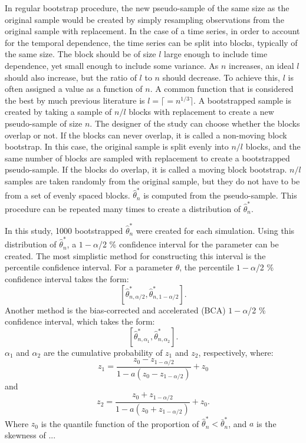 \documentclass[12pt, letterpaper, titlepage]{article}
\begin{document}
In regular bootstrap procedure, the new pseudo-sample of the same size as the original sample would be created by simply resampling observations from the original sample with replacement. In the case of a time series, in order to account for the temporal dependence, the time series can be split into blocks, typically of the same size. The block should be of size $l$ large enough to include time dependence, yet small enough to include some variance. As $n$ increases, an ideal $l$ should also increase, but the ratio of $l$ to $n$ should decrease. To achieve this, $l$ is often assigned a value as a function of $n$. A common function that is considered the best by much previous literature is $l = \lceil = n^{1/3} \rceil$. \citep{buhlmann1999block} A bootstrapped sample is created by taking a sample of $n / l$ blocks with replacement to create a new pseudo-sample of size $n$. The designer of the study can choose whether the blocks overlap or not. If the blocks can never overlap, it is called a non-moving block bootstrap. In this case, the original sample is split evenly into $n / l$ blocks, and the same number of blocks are sampled with replacement to create a bootstrapped pseudo-sample. If the blocks do overlap, it is called a moving block bootstrap. $n / l$ samples are taken randomly from the original sample, but they do not have to be from a set of evenly spaced blocks. $\hat\theta_n^*$ is computed from the pseudo-sample. This procedure can be repeated many times to create a distribution of $\hat\theta_n^*$. 

In this study, 1000 bootstrapped $\hat\theta_n^*$ were created for each simulation. Using this distribution of $\hat\theta_n^*$, a $1 - \alpha$/2 \% confidence interval for the parameter can be created. The most simplistic method for constructing this interval is the percentile confidence interval. For a parameter $\theta$, the percentile $1 - \alpha$/2 \% confidence interval takes the form: 
\[ [\hat\theta_{n, \alpha/2}^*, \hat\theta_{n, 1 - \alpha/2}^*].\] 
Another method is the bias-corrected and accelerated 
(BCA) $1 - \alpha$/2 \% confidence interval, which takes the form: 
\[ [\hat\theta_{n, \alpha_1}^*,\hat\theta_{n, \alpha_2}^*].\] 
$\alpha_{1}$ and $\alpha_{2}$ are the cumulative probability of $z_{1}$ and $z_{2}$, respectively, where:
\[z_{1} = \frac{z_{0} - z_{1 - \alpha/2}}{1 - a(z_{0} - z_{1 - \alpha/2})} + z_{0}\] and
\[z_{2} = \frac{z_{0} + z_{1 - \alpha/2}}{1 - a(z_{0} + z_{1 - \alpha/2})} + z_{0}.\] 
Where $z_0$ is the quantile function of the proportion of $\hat\theta_n^* < \bar\theta_n^*$, and $a$ is the skewness of ...
	
\end{document}
